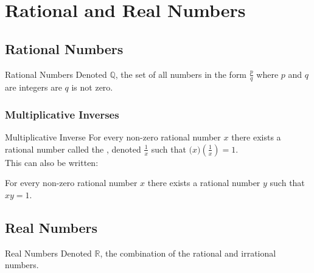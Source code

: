 \documentclass[../notes.tex]{subfiles}
\begin{document}
	\ifSubfilesClassLoaded{\setcounter{chapter}{1}}{}
	\chapter{Rational and Real Numbers}
		\section{Rational Numbers}
			\begin{definition}{Rational Numbers}
				Denoted $\mathbb{Q}$, the set of all numbers in the form $\frac{p}{q}$ where $p$ and $q$ are integers are $q$ is not zero.
			\end{definition}
			\subsection{Multiplicative Inverses}
				\begin{definition}{Multiplicative Inverse}
					For every non-zero rational number $x$ there exists a rational number called the , denoted $\frac{1}{x}$ such that $\bigl(x\bigr)\left(\frac{1}{x}\right) = 1$.\\
					\nopagebreak
					This can also be written:
					\nopagebreak
					\begin{indentparagraph}
						For every non-zero rational number $x$ there exists a rational number $y$ such that $xy = 1$.
					\end{indentparagraph}
				\end{definition}
		\section{Real Numbers}
				\begin{definition}{Real Numbers}
					Denoted $\mathbb{R}$, the combination of the rational and irrational numbers.
				\end{definition}
\end{document}
